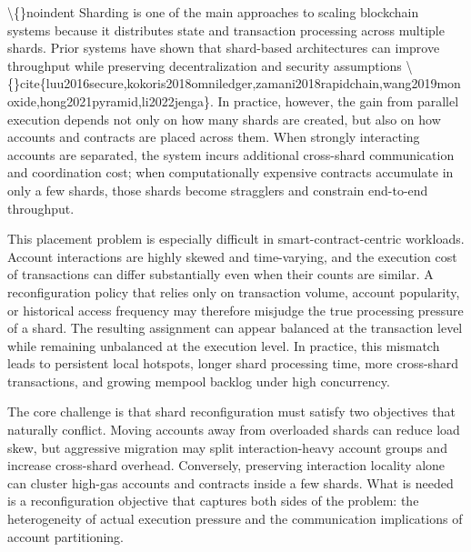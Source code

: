 \documentclass{article}
\begin{document}
\textbackslash\{\}noindent
Sharding is one of the main approaches to scaling blockchain systems because it distributes state and transaction processing across multiple shards. Prior systems have shown that shard-based architectures can improve throughput while preserving decentralization and security assumptions \textbackslash\{\}cite\{luu2016secure,kokoris2018omniledger,zamani2018rapidchain,wang2019monoxide,hong2021pyramid,li2022jenga\}. In practice, however, the gain from parallel execution depends not only on how many shards are created, but also on how accounts and contracts are placed across them. When strongly interacting accounts are separated, the system incurs additional cross-shard communication and coordination cost; when computationally expensive contracts accumulate in only a few shards, those shards become stragglers and constrain end-to-end throughput.

This placement problem is especially difficult in smart-contract-centric workloads. Account interactions are highly skewed and time-varying, and the execution cost of transactions can differ substantially even when their counts are similar. A reconfiguration policy that relies only on transaction volume, account popularity, or historical access frequency may therefore misjudge the true processing pressure of a shard. The resulting assignment can appear balanced at the transaction level while remaining unbalanced at the execution level. In practice, this mismatch leads to persistent local hotspots, longer shard processing time, more cross-shard transactions, and growing mempool backlog under high concurrency.

The core challenge is that shard reconfiguration must satisfy two objectives that naturally conflict. Moving accounts away from overloaded shards can reduce load skew, but aggressive migration may split interaction-heavy account groups and increase cross-shard overhead. Conversely, preserving interaction locality alone can cluster high-gas accounts and contracts inside a few shards. What is needed is a reconfiguration objective that captures both sides of the problem: the heterogeneity of actual execution pressure and the communication implications of account partitioning.
\end{document}
